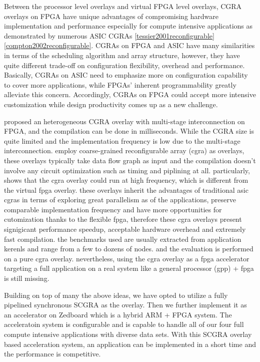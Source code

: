Between the processor level overlays and virtual FPGA level overlays, CGRA overlays on FPGA have unique advantages of compromising hardware implementation and performance especially for compute intensive applications as demonstrated by numerous ASIC CGRAs \ref{tessier2001reconfigurable} \ref{compton2002reconfigurable}. CGRAs on FPGA and ASIC have many similarities in terms of the scheduling algorithm and array structure, however, they have quite different trade-off on configuration flexibility, overhead and performance. Basically, CGRAs on ASIC need to emphasize more on configuration capability to cover more applications, while FPGAs' inherent programmability greatly alleviate this concern. Accordingly, CGRAs on FPGA could accept more intensive customization while design productivity comes up as a new challenge. 

\cite{ferreira2011fpga} proposed an heterogeneous CGRA overlay with multi-stage interconnection on FPGA, and the compilation can be done in milliseconds. While the CGRA size is quite limited and the implementation frequency is low due to the multi-stage interconnection. \cite{shukla2006quku} \cite{capalijia2013pipelined} employ coarse-grained reconfigurable array (cgra) as overlays, these overlays typically take data flow graph as input and the compilation doesn't involve any circuit optimization such as timing and piplining at all. particularly, \cite{capalijia2013pipelined} shows that the cgra overlay could run at high frequency, which is different from the virtual fpga overlay. these overlays inherit the advantages of traditional asic cgras \cite{tessier2001reconfigurable} in terms of exploring great parallelism as of the applications, preserve comparable implementation frequency and have more opportunities for cutomization thanks to the flexible fpga, therefore these cgra overlays present signigicant performance speedup, acceptable hardware overhead and extremely fast compilation. the benchmarks used are usually extracted from application kerenls and range from a few to dozens of nodes. and the evaluation is performed on a pure cgra overlay. nevertheless, using the cgra overlay as a fpga accelerator targeting a full application on a real system like a general processor (gpp) + fpga is still missing. 

Building on top of many the above ideas, we have opted to utilize a fully pipelined synchronous SCGRA as the overlay. Then we further implement it as an accelerator on Zedboard which is a hybrid ARM + FPGA system. The acceleratoin system is configurable and is capable to handle all of our four full compute intensive applications with diverse data sets. With this SCGRA overlay based acceleration system, an application can be implemented in a short time and the performance is competitive.


